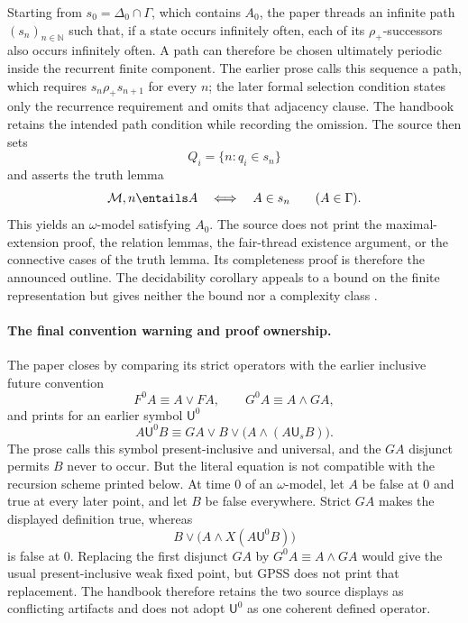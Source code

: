 Starting from \(s_0=\Delta_0\cap\Gamma\), which contains \(A_0\), the paper
threads an
infinite path \((s_n)_{n\in\mathbb N}\) such that, if a state occurs infinitely
often, each of its \(\rho_+\)-successors also occurs infinitely often.  A path
can therefore be chosen ultimately periodic inside the recurrent finite
component.  The earlier prose calls this sequence a path, which requires
\(s_n\mathrel{\rho_+}s_{n+1}\) for every \(n\); the later formal selection
condition states only the recurrence requirement and omits that adjacency
clause.  The handbook retains the intended path condition while recording the
omission.  The source then sets
\[
 Q_i=\{n:q_i\in s_n\}
\]
and asserts the truth lemma
\[
 \mathcal M,n\entails A
 \quad\Longleftrightarrow\quad
 A\in s_n
 \qquad(A\in\Gamma).
\]
This yields an \(\omega\)-model satisfying \(A_0\).  The source does not print
the maximal-extension proof, the relation lemmas, the fair-thread existence
argument, or the connective cases of the truth lemma.  Its completeness proof
is therefore the announced outline.  The decidability corollary appeals to a
bound on the finite representation but gives neither the bound nor a
complexity class \cite[pp.~171--172]{GabbayPnueliShelahStavi1980}.

\paragraph{The final convention warning and proof ownership.}
The paper closes by comparing its strict operators with the earlier inclusive
future convention
\[
 F^0A\equiv A\lor FA,
 \qquad
 G^0A\equiv A\land GA,
\]
and prints for an earlier symbol \(\mathsf U^0\)
\[
 A\mathbin{\mathsf U^0}B
 \equiv
 GA\lor B\lor\bigl(A\land(A\mathbin{\mathsf U_s}B)\bigr).
\]
The prose calls this symbol present-inclusive and universal, and the \(GA\)
disjunct permits \(B\) never to occur.  But the literal equation is not
compatible with the recursion scheme printed below.  At time \(0\) of an
\(\omega\)-model, let \(A\) be false at \(0\) and true at every later point,
and let \(B\) be false everywhere.  Strict \(GA\) makes the displayed
definition true, whereas
\[
 B\lor\bigl(A\land X(A\mathbin{\mathsf U^0}B)\bigr)
\]
is false at \(0\).  Replacing the first disjunct \(GA\) by
\(G^0A\equiv A\land GA\) would give the usual present-inclusive weak fixed
point, but GPSS does not print that replacement.  The handbook therefore
retains the two source displays as conflicting artifacts and does not adopt
\(\mathsf U^0\) as one coherent defined operator.

